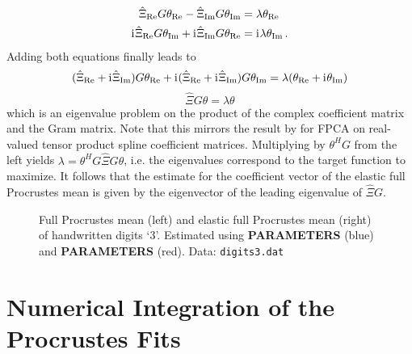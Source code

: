 \begin{align}
  \hat\Xi_{\mathrm{Re}} G \theta_{\mathrm{Re}} - \hat\Xi_{\mathrm{Im}} G \theta_{\mathrm{Im}} & = \lambda \theta_{\mathrm{Re}}\\
   \mathrm{i}\mkern1mu \hat\Xi_{\mathrm{Re}} G \theta_{\mathrm{Im}} + \mathrm{i}\mkern1mu \hat\Xi_{\mathrm{Im}} G \theta_{\mathrm{Re}} & = \mathrm{i}\mkern1mu \lambda \theta_{\mathrm{Im}} \,.
\end{align}
Adding both equations finally leads to  
\begin{equation}
  ( \hat\Xi_{\mathrm{Re}} + \mathrm{i}\mkern1mu \hat\Xi_{\mathrm{Im}}) G \theta_{\mathrm{Re}} + \mathrm{i}\mkern1mu (\hat\Xi_{\mathrm{Re}} + \mathrm{i}\mkern1mu \hat\Xi_{\mathrm{Im}}) G \theta_{\mathrm{Im}} = \lambda ( \theta_{\mathrm{Re}} + \mathrm{i}\mkern1mu \theta_{\mathrm{Im}})
\end{equation}
\begin{equation}
  \hat\Xi G \theta = \lambda \theta
\end{equation}
which is an eigenvalue problem on the product of the complex coefficient matrix and the Gram matrix.
Note that this mirrors the result by \cite{ReissXu2020} for FPCA on real-valued tensor product spline coefficient matrices.
Multiplying by $\theta^H G$ from the left yields $\lambda = \theta^H G \hat\Xi G \theta$, i.e. the eigenvalues correspond to the target function to maximize.
It follows that the estimate for the coefficient vector of the elastic full Procrustes mean is given by the eigenvector of the leading eigenvalue of $\hat\Xi G$.

\begin{figure}
  \centering
  \begin{subfigure}{.48\textwidth}
    \centering
  \end{subfigure}\hfill%
  \begin{subfigure}{.48\textwidth}
    \centering
  \end{subfigure}
  \caption{Full Procrustes mean (left) and elastic full Procrustes mean (right) of handwritten digits \enquote*{3}. Estimated using \textbf{PARAMETERS} (blue) and \textbf{PARAMETERS} (red). Data: \texttt{digits3.dat}}
  \label{fig:3-mean}
\end{figure}




\section{Numerical Integration of the Procrustes Fits}
\label{sec:3-pfits}

